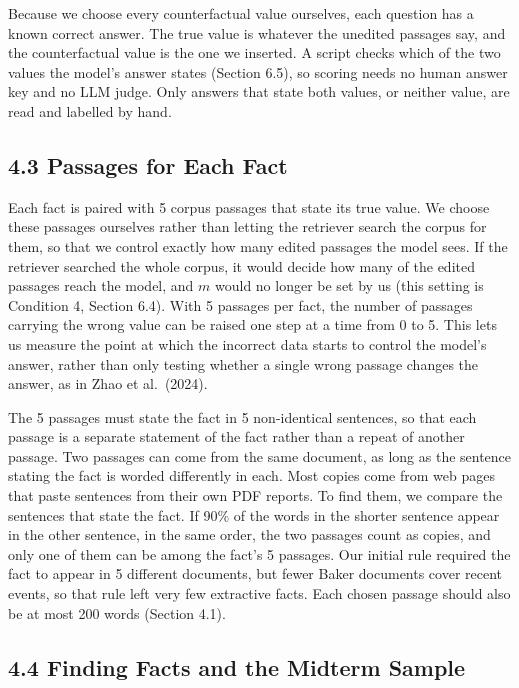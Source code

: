 \documentclass[
  12pt,
  letterpaper,
]{article}
\begin{document}
Because we choose every counterfactual value
ourselves, each question has a known correct
answer. The true value is whatever the unedited
passages say, and the counterfactual value is the
one we inserted. A script checks which of the two
values the model's answer states (Section 6.5), so
scoring needs no human answer key and no LLM
judge. Only answers that state both values, or
neither value, are read and labelled by hand.

\subsection{4.3 Passages for Each
Fact}\label{passages-for-each-fact}

Each fact is paired with 5 corpus passages that
state its true value. We choose these passages
ourselves rather than letting the retriever search
the corpus for them, so that we control exactly
how many edited passages the model sees. If the
retriever searched the whole corpus, it would
decide how many of the edited passages reach the
model, and \(m\) would no longer be set by us
(this setting is Condition 4, Section 6.4). With 5
passages per fact, the number of passages carrying
the wrong value can be raised one step at a time
from 0 to 5. This lets us measure the point at
which the incorrect data starts to control the
model's answer, rather than only testing whether a
single wrong passage changes the answer, as in
Zhao et al.~(2024).

The 5 passages must state the fact in 5
non-identical sentences, so that each passage is a
separate statement of the fact rather than a
repeat of another passage. Two passages can come
from the same document, as long as the sentence
stating the fact is worded differently in each.
Most copies come from web pages that paste
sentences from their own PDF reports. To find
them, we compare the sentences that state the
fact. If 90\% of the words in the shorter sentence
appear in the other sentence, in the same order,
the two passages count as copies, and only one of
them can be among the fact's 5 passages. Our
initial rule required the fact to appear in 5
different documents, but fewer Baker documents
cover recent events, so that rule left very few
extractive facts. Each chosen passage should also
be at most 200 words (Section 4.1).

\subsection{4.4 Finding Facts and the Midterm
Sample}\label{finding-facts-and-the-midterm-sample}
\end{document}
